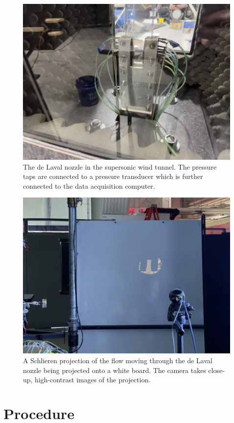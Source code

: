 \begin{figure}[htpb]
    \centering
    \includegraphics[width=0.75\linewidth]{Figures/de_laval_nozzle.jpeg}
    \caption[The de Laval nozzle in the supersonic wind tunnel.]{The de Laval nozzle in the supersonic wind tunnel. The pressure taps are connected to a pressure transducer which is further connected to the data acquisition computer.}
    \label{fig:de_laval_nozzle}
\end{figure}

\begin{figure}[htpb]
    \centering
    \includegraphics[width=0.75\linewidth]{Figures/schlieren_nozzle.jpeg}
    \caption[A Schlieren projection of the flow moving through the de Laval nozzle being projected onto a white board.]{A Schlieren projection of the flow moving through the de Laval nozzle being projected onto a white board. The camera takes close-up, high-contrast images of the projection.}
    \label{fig:schlieren_projection}
\end{figure}

\section{Procedure} \label{sec:procedure}

